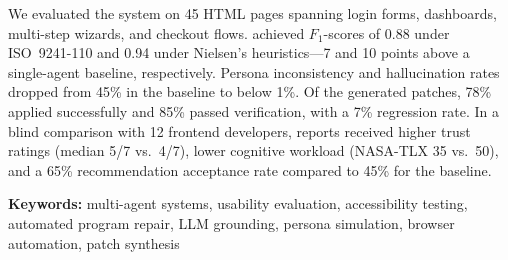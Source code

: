 We evaluated the system on 45 HTML pages spanning login forms, dashboards, multi-step wizards, and checkout flows. \versimux{} achieved $F_1$-scores of 0.88 under ISO~9241-110 and 0.94 under Nielsen's heuristics---7 and 10 points above a single-agent baseline, respectively. Persona inconsistency and hallucination rates dropped from 45\% in the baseline to below 1\%. Of the generated patches, 78\% applied successfully and 85\% passed verification, with a 7\% regression rate. In a blind comparison with 12 frontend developers, \versimux{} reports received higher trust ratings (median 5/7 vs.\ 4/7), lower cognitive workload (NASA-TLX 35 vs.\ 50), and a 65\% recommendation acceptance rate compared to 45\% for the baseline.

\vspace{1em}
\noindent\textbf{Keywords:} multi-agent systems, usability evaluation, accessibility testing, automated program repair, LLM grounding, persona simulation, browser automation, patch synthesis



